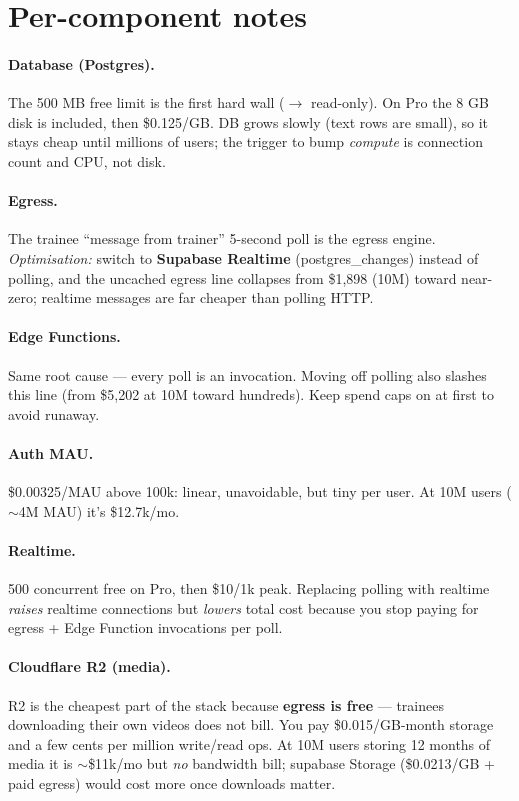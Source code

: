 \documentclass[11pt]{article}
\begin{document}
\section{Per-component notes}

\paragraph{Database (Postgres).} The 500 MB free limit is the first hard wall ($\rightarrow$ read-only). On Pro the 8 GB disk is included, then \$0.125/GB. DB grows slowly (text rows are small), so it stays cheap until millions of users; the trigger to bump \emph{compute} is connection count and CPU, not disk.

\paragraph{Egress.} The trainee ``message from trainer'' 5-second poll is the egress engine. \textit{Optimisation:} switch to \textbf{Supabase Realtime} (postgres\_changes) instead of polling, and the uncached egress line collapses from \$1{,}898 (10M) toward near-zero; realtime messages are far cheaper than polling HTTP.

\paragraph{Edge Functions.} Same root cause — every poll is an invocation. Moving off polling also slashes this line (from \$5{,}202 at 10M toward hundreds). Keep spend caps on at first to avoid runaway.

\paragraph{Auth MAU.} \$0.00325/MAU above 100k: linear, unavoidable, but tiny per user. At 10M users ($\sim$4M MAU) it's \$12.7k/mo.

\paragraph{Realtime.} 500 concurrent free on Pro, then \$10/1k peak. Replacing polling with realtime \emph{raises} realtime connections but \emph{lowers} total cost because you stop paying for egress + Edge Function invocations per poll.

\paragraph{Cloudflare R2 (media).} R2 is the cheapest part of the stack because \textbf{egress is free} — trainees downloading their own videos does not bill. You pay \$0.015/GB-month storage and a few cents per million write/read ops. At 10M users storing 12 months of media it is $\sim$\$11k/mo but \textit{no} bandwidth bill; supabase Storage (\$0.0213/GB + paid egress) would cost more once downloads matter.
\end{document}
